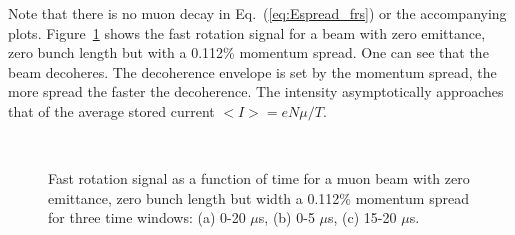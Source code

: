 Note that there is no muon decay in Eq.~(\ref{eq:Espread_frs}) or the accompanying plots.
Figure~\ref{fig:Espread_frs} shows the fast rotation signal for a beam with zero emittance, zero bunch length but with a 0.112\% momentum spread. 
One can see that the beam decoheres. The decoherence envelope is set by the momentum spread, the more spread the faster the decoherence.
The intensity asymptotically approaches that of the average stored current $<I> = eN\mu/T$.

\begin{figure}[bt]
\centering
{}\\
\caption{Fast rotation signal as a function of time for a muon beam with zero emittance, zero bunch length but width a 0.112\% momentum spread for three time windows: (a) 0-20 $\mu$s, (b) 0-5 $\mu$s, (c) 15-20 $\mu$s.}
\label{fig:Espread_frs}
\end{figure}

